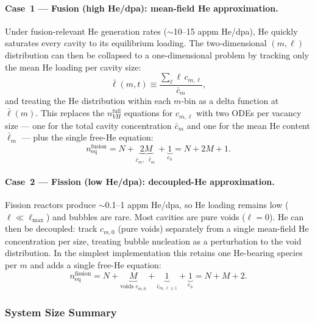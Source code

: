 \documentclass[pdflatex,sn-basic]{sn-jnl} %
\begin{document}
\paragraph{Case~1 --- Fusion (high He/dpa): mean-field He approximation.}
Under fusion-relevant He generation rates ($\sim$10--15 appm He/dpa), He
quickly saturates every cavity to its equilibrium loading. The two-dimensional
$(m,\ell)$ distribution can then be collapsed to a one-dimensional problem
by tracking only the mean He loading per cavity size:
\begin{equation}\label{eq:mean_He}
    \bar{\ell}(m,t) \equiv \frac{\sum_\ell \ell\,c_{m,\ell}}{\bar{c}_m},
\end{equation}
and treating the He distribution within each $m$-bin as a delta function
at $\bar{\ell}(m)$. This replaces the $n_{VH}^{\mathrm{full}}$ equations
for $c_{m,\ell}$ with two ODEs per vacancy size --- one for the total
cavity concentration $\bar{c}_m$ and one for the mean He content
$\bar{\ell}_m$ --- plus the single free-He equation:
\begin{equation}\label{eq:nVH_fusion}
    n_{\mathrm{eq}}^{\mathrm{fusion}}
    = N + \underbrace{2M}_{\bar{c}_m,\;\bar{\ell}_m} + \underbrace{1}_{c_h}
    = N + 2M + 1.
\end{equation}

\paragraph{Case~2 --- Fission (low He/dpa): decoupled-He approximation.}
Fission reactors produce $\sim$0.1--1 appm He/dpa, so He loading remains
low ($\ell \ll \ell_{\max}$) and bubbles are rare. Most cavities are pure
voids ($\ell = 0$). He can then be decoupled: track $c_{m,0}$ (pure voids)
separately from a single mean-field He concentration per size, treating
bubble nucleation as a perturbation to the void distribution. In the
simplest implementation this retains one He-bearing species per $m$ and
adds a single free-He equation:
\begin{equation}\label{eq:nVH_fission}
    n_{\mathrm{eq}}^{\mathrm{fission}}
    = N + \underbrace{M}_{\text{voids }c_{m,0}} + \underbrace{1}_{\bar{c}_{m,\ell\geq 1}}
      + \underbrace{1}_{c_h}
    = N + M + 2.
\end{equation}

\subsubsection{System Size Summary}
\label{sec:system_size_table}
\end{document}
